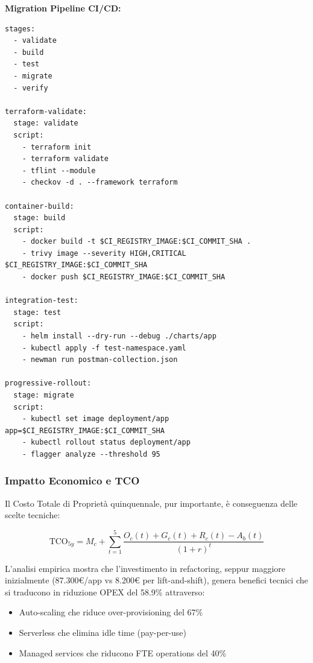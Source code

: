 \textbf{Migration Pipeline CI/CD:}
\begin{lstlisting}[caption={GitLab CI per Migrazione Progressiva},label={lst:migration_pipeline}]
stages:
  - validate
  - build
  - test
  - migrate
  - verify

terraform-validate:
  stage: validate
  script:
    - terraform init
    - terraform validate
    - tflint --module
    - checkov -d . --framework terraform

container-build:
  stage: build
  script:
    - docker build -t $CI_REGISTRY_IMAGE:$CI_COMMIT_SHA .
    - trivy image --severity HIGH,CRITICAL $CI_REGISTRY_IMAGE:$CI_COMMIT_SHA
    - docker push $CI_REGISTRY_IMAGE:$CI_COMMIT_SHA

integration-test:
  stage: test
  script:
    - helm install --dry-run --debug ./charts/app
    - kubectl apply -f test-namespace.yaml
    - newman run postman-collection.json

progressive-rollout:
  stage: migrate
  script:
    - kubectl set image deployment/app app=$CI_REGISTRY_IMAGE:$CI_COMMIT_SHA
    - kubectl rollout status deployment/app
    - flagger analyze --threshold 95
\end{lstlisting}

\subsubsection{Impatto Economico e TCO}

Il Costo Totale di Proprietà quinquennale, pur importante, è conseguenza delle scelte tecniche:

\begin{equation}
\text{TCO}_{5y} = M_c + \sum_{t=1}^{5} \frac{O_c(t) + G_c(t) + R_c(t) - A_b(t)}{(1+r)^t}
\end{equation}

L'analisi empirica mostra che l'investimento in refactoring, seppur maggiore inizialmente (87.300€/app vs 8.200€ per lift-and-shift), genera benefici tecnici che si traducono in riduzione OPEX del 58.9\% attraverso:
\begin{itemize}
    \item Auto-scaling che riduce over-provisioning del 67\%
    \item Serverless che elimina idle time (pay-per-use)
    \item Managed services che riducono FTE operations del 40\%
\end{itemize}

